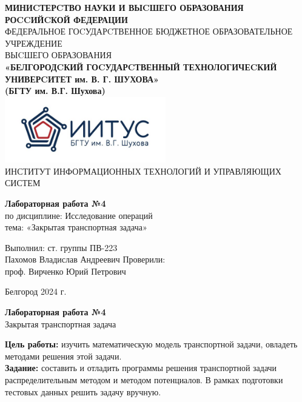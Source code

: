 \documentclass[a4paper,14pt]{extarticle}
\newcommand\textbox[1]{
	\parbox{.45\textwidth}{#1}
}
\begin{document}
\begin{center}
    \small{
        \textbf{МИНИCТЕРCТВО НАУКИ И ВЫCШЕГО ОБРАЗОВАНИЯ РОCCИЙCКОЙ ФЕДЕРАЦИИ}\\
        ФЕДЕРАЛЬНОЕ ГОCУДАРCТВЕННОЕ БЮДЖЕТНОЕ ОБРАЗОВАТЕЛЬНОЕ УЧРЕЖДЕНИЕ\\ВЫCШЕГО ОБРАЗОВАНИЯ \\
        \textbf{«БЕЛГОРОДCКИЙ ГОCУДАРCТВЕННЫЙ ТЕХНОЛОГИЧЕCКИЙ\\УНИВЕРCИТЕТ им. В. Г. ШУХОВА»\\ (БГТУ им. В.Г. Шухова)} \\
        \bigbreak
        \includegraphics[width=70mm]{log}\\
        ИНСТИТУТ ИНФОРМАЦИОННЫХ ТЕХНОЛОГИЙ И УПРАВЛЯЮЩИХ СИСТЕМ\\}
\end{center}

\vfill
\begin{center}
    \large{
        \textbf{
            Лабораторная работа №4}}\\
    \normalsize{
        по дисциплине: Исследование операций \\
        тема: «Закрытая транспортная задача»}
\end{center}
\vfill
\hfill\textbox{
    Выполнил: ст. группы ПВ-223\\Пахомов Владислав Андреевич
    \bigbreak
    Проверили: \\проф. Вирченко Юрий Петрович
}
\vfill\begin{center}
    Белгород 2024 г.
\end{center}
\newpage
\begin{center}
    \textbf{Лабораторная работа №4}\\
    Закрытая транспортная задача\\
\end{center}
\textbf{Цель работы: }изучить математическую модель транспортной
задачи, овладеть методами решения этой задачи.\\

\textbf{Задание: }составить и отладить программы решения транспортной задачи
распределительным методом и методом потенциалов. В рамках
подготовки тестовых данных решить задачу вручную.
\end{document}

